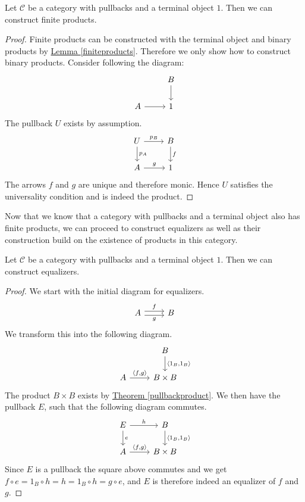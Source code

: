 \begin{fact}
  \label{pullbackproduct}
  Let $\mathscr C$ be a category with pullbacks and a terminal object $1$.
  Then we can construct finite products.
\end{fact}
\begin{proof}
Finite products can be constructed
with the terminal object and binary products by
\hyperref[finiteproducts]{Lemma \ref*{finiteproducts}}.
Therefore we only show how to construct binary products.
Consider following the diagram:
\[
  \begin{tikzcd}
    & B \arrow{d} \\
    A \arrow{r} & 1
  \end{tikzcd}
\]
The pullback $U$ exists by assumption.
\[
  \begin{tikzcd}
    U \arrow{r}{p_B} \arrow{d}{p_A} & B \arrow{d}{f} \\
    A \arrow{r}{g} & 1
  \end{tikzcd}
\]
The arrows $f$ and $g$ are unique and therefore monic.
Hence $U$ satisfies the universality condition and is indeed the product.
\end{proof}

Now that we know that a category with pullbacks and a terminal object
also has finite products, we can proceed to construct equalizers as well
as their construction build on the existence of products in this category.

\begin{theorem}
  Let $\mathscr C$ be a category with pullbacks and a terminal object $1$.
  Then we can construct equalizers.
\end{theorem}
\begin{proof}
  We start with the initial diagram for equalizers.
  \[
    \begin{tikzcd}
      A \arrow[shift left]{r}{f} \arrow[shift right, swap]{r}{g} & B
    \end{tikzcd}
  \]
  We transform this into the following diagram.
  \[
    \begin{tikzcd}
      & B \arrow{d}{\langle 1_B, 1_B \rangle} \\
      A \arrow{r}{\langle f,g \rangle} & B \times B
    \end{tikzcd}
  \]
  The product $B \times B$ exists by \hyperref[pullbackproduct]{Theorem \ref*{pullbackproduct}}.
  We then have the pullback $E$, such that the following diagram commutes.
  \[
    \begin{tikzcd}
      E \arrow{r}{h} \arrow{d}{e} & B \arrow{d}{\langle 1_B, 1_B \rangle} \\
      A \arrow{r}{\langle f,g \rangle} & B \times B
    \end{tikzcd}
  \]
  Since $E$ is a pullback the square above commutes and
  we get $f \circ e = 1_B \circ h = h = 1_B \circ h = g \circ e$, and $E$ is therefore
  indeed an equalizer of $f$ and $g$.
\end{proof}

